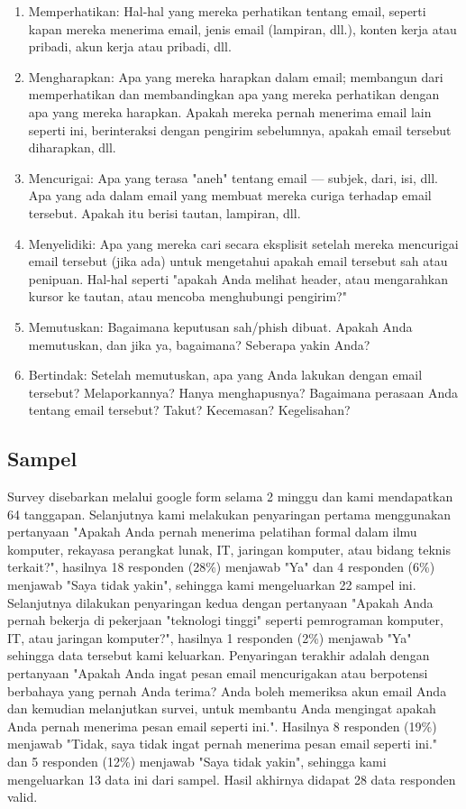 \documentclass[lettersize,journal]{IEEEtran}
\begin{document}
\begin{enumerate}
  \item{Memperhatikan}: Hal-hal yang mereka perhatikan tentang email, seperti kapan mereka menerima email, jenis email (lampiran, dll.), konten kerja atau pribadi, akun kerja atau pribadi, dll.
  \item{Mengharapkan}: Apa yang mereka harapkan dalam email; membangun dari memperhatikan dan membandingkan apa yang mereka perhatikan dengan apa yang mereka harapkan. Apakah mereka pernah menerima email lain seperti ini, berinteraksi dengan pengirim sebelumnya, apakah email tersebut diharapkan, dll.
  \item{Mencurigai}: Apa yang terasa "aneh" tentang email — subjek, dari, isi, dll. Apa yang ada dalam email yang membuat mereka curiga terhadap email tersebut. Apakah itu berisi tautan, lampiran, dll.
  \item{Menyelidiki}: Apa yang mereka cari secara eksplisit setelah mereka mencurigai email tersebut (jika ada) untuk mengetahui apakah email tersebut sah atau penipuan. Hal-hal seperti "apakah Anda melihat header, atau mengarahkan kursor ke tautan, atau mencoba menghubungi pengirim?"
  \item{Memutuskan}: Bagaimana keputusan sah/phish dibuat. Apakah Anda memutuskan, dan jika ya, bagaimana? Seberapa yakin Anda?
  \item{Bertindak}: Setelah memutuskan, apa yang Anda lakukan dengan email tersebut? Melaporkannya? Hanya menghapusnya? Bagaimana perasaan Anda tentang email tersebut? Takut? Kecemasan? Kegelisahan?
\end{enumerate}

\subsection{Sampel}

Survey disebarkan melalui google form selama 2 minggu dan kami mendapatkan 64
tanggapan. Selanjutnya kami melakukan penyaringan pertama menggunakan
pertanyaan "Apakah Anda pernah menerima pelatihan formal dalam ilmu komputer,
rekayasa perangkat lunak, IT, jaringan komputer, atau bidang teknis terkait?",
hasilnya 18 responden (28\%) menjawab "Ya" dan 4 responden (6\%) menjawab "Saya
tidak yakin", sehingga kami mengeluarkan 22 sampel ini. Selanjutnya dilakukan
penyaringan kedua dengan pertanyaan "Apakah Anda pernah bekerja di pekerjaan
"teknologi tinggi" seperti pemrograman komputer, IT, atau jaringan komputer?",
hasilnya 1 responden (2\%) menjawab "Ya" sehingga data tersebut kami keluarkan.
Penyaringan terakhir adalah dengan pertanyaan "Apakah Anda ingat pesan email
mencurigakan atau berpotensi berbahaya yang pernah Anda terima? Anda boleh
memeriksa akun email Anda dan kemudian melanjutkan survei, untuk membantu Anda
mengingat apakah Anda pernah menerima pesan email seperti ini.". Hasilnya 8
responden (19\%) menjawab "Tidak, saya tidak ingat pernah menerima pesan email
seperti ini." dan 5 responden (12\%) menjawab "Saya tidak yakin", sehingga kami
mengeluarkan 13 data ini dari sampel. Hasil akhirnya didapat 28 data responden
valid.
\end{document}
